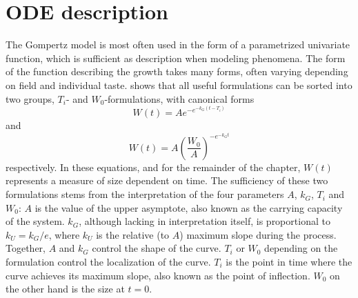 \section{ODE description}

The Gompertz model is most often used in the form of a parametrized univariate function, which is sufficient as description when modeling phenomena.
The form of the function describing the growth takes many forms, often varying depending on field and individual taste.
\cite{tjorve2017gompertz} shows that all useful formulations can be sorted into two groups, \(T_i\)- and \(W_0\)-formulations, with canonical forms
\begin{equation} \label{eq:gompertz-ti-function}
  W(t) = A e^{-e^{-k_G(t-T_i)}}
\end{equation}
and
\begin{equation} \label{eq:gompertz-w0-function}
  W(t) = A \left(\frac{W_0}{A}\right)^{-e^{-k_G t}}
\end{equation}
respectively.
In these equations, and for the remainder of the chapter, \(W(t)\) represents a measure of size dependent on time.
The sufficiency of these two formulations stems from the interpretation of the four parameters \(A\), \(k_G\), \(T_i\) and \(W_0\):
\(A\) is the value of the upper asymptote, also known as the carrying capacity of the system.
\(k_G\), although lacking in interpretation itself, is proportional to \(k_U = k_G / e\), where \(k_U\) is the relative (to \(A\)) maximum slope during the process.
Together, \(A\) and \(k_G\) control the shape of the curve.
\(T_i\) or \(W_0\) depending on the formulation control the localization of the curve.
\(T_i\) is the point in time where the curve achieves its maximum slope, also known as the point of inflection.
\(W_0\) on the other hand is the size at \(t=0\).


